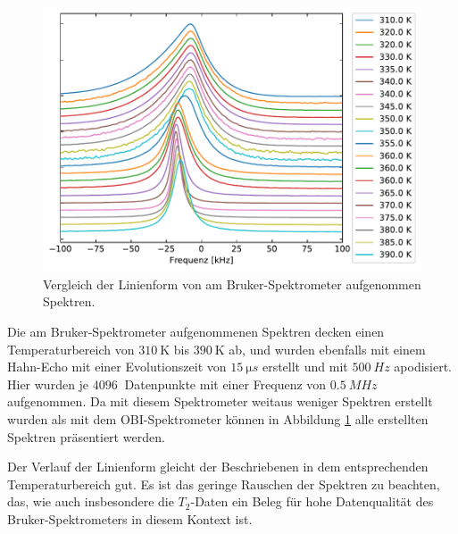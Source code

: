 \begin{figure}
	\begin{center}
		\includegraphics[width=\textwidth]{graphics/plot/bruker_lineshape.pdf}
	\end{center}
	\caption{Vergleich der Linienform von am Bruker-Spektrometer aufgenommen Spektren.} \label{fig:res:bruker_linienform}
\end{figure}
Die am Bruker-Spektrometer aufgenommenen Spektren decken einen Temperaturbereich von $\SI{310}{\kelvin}$ bis $\SI{390}{\kelvin}$ ab, und wurden ebenfalls mit einem Hahn-Echo mit einer Evolutionszeit von $\SI{15}{\micro s}$ erstellt und mit $\SI{500}{Hz}$ apodisiert. Hier wurden je $\SI{4096}{}$ Datenpunkte mit einer Frequenz von $\SI{0.5}{MHz}$ aufgenommen. Da mit diesem Spektrometer weitaus weniger Spektren erstellt wurden als mit dem OBI-Spektrometer können in Abbildung \ref{fig:res:bruker_linienform} alle erstellten Spektren präsentiert werden.

Der Verlauf der Linienform gleicht der Beschriebenen in dem entsprechenden Temperaturbereich gut. Es ist das geringe Rauschen der Spektren zu beachten, das, wie auch insbesondere die $T_2$-Daten ein Beleg für hohe Datenqualität des Bruker-Spektrometers in diesem Kontext ist.

